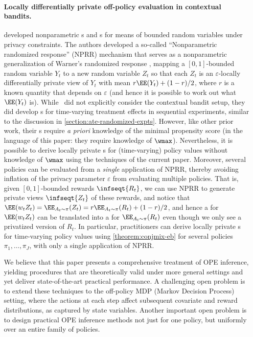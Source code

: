 \paragraph{Locally differentially private off-policy evaluation in contextual bandits.}
\citet{waudby2022locally} developed nonparametric \cs{}s and \ci{}s for means of bounded random variables under privacy constraints. The authors developed a so-called ``Nonparametric randomized response'' (NPRR) mechanism that serves as a nonparametric generalization of Warner's randomized response \citep{warner1965randomized}, mapping a $[0, 1]$-bounded random variable $Y_t$ to a new random variable $Z_t$ so that each $Z_t$ is an $\varepsilon$-locally differentially private view of $Y_t$ with mean $r\EE(Y_t) + (1-r)/2$, where $r$ is a known quantity that depends on $\varepsilon$ (and hence it is possible to work out what $\EE(Y_t)$ is). While~\citet{waudby2022locally} did not explicitly consider the contextual bandit setup, they did develop \cs{}s for time-varying treatment effects in sequential experiments, similar to the discussion in \cref{section:ate-randomized-expts}. However, like other prior work, their \cs{}s require \emph{a priori} knowledge of the minimal propensity score (in the language of this paper: they require knowledge of $\wmax$). Nevertheless, it is possible to derive locally private \cs{}s for (time-varying) policy values without knowledge of $\wmax$ using the techniques of the current paper. Moreover, several policies can be evaluated from a \emph{single} application of NPRR, thereby avoiding inflation of the privacy parameter $\varepsilon$ from evaluating multiple policies. That is, given $[0, 1]$-bounded rewards $\infseqt{R_t}$, we can use NPRR to generate private views $\infseqt{Z_t}$ of these rewards, and notice that $\EE(w_tZ_t) = \EE_{A_t \sim \pi}(Z_t) = r\EE_{A_t\sim\pi}(R_t) + (1-r)/2$, and hence a \cs{} for $\EE(w_tZ_t)$ can be translated into a \cs{} for $\EE_{A_t \sim \pi}(R_t)$ even though we only see a privatized version of $R_t$. In particular, practitioners can derive locally private \cs{}s for time-varying policy values using \cref{theorem:conjmix-eb} for several policies $\pi_1, \dots, \pi_J$, with only a single application of NPRR.


\bigskip

We believe that this paper presents a comprehensive treatment of OPE inference, yielding procedures that are theoretically valid under more general settings and yet deliver state-of-the-art practical performance. A challenging open problem is to extend these techniques to the off-policy MDP (Markov Decision Process) setting, where the actions at each step affect subsequent covariate and reward distributions, as captured by state variables. Another important open problem is to design practical OPE inference methods not just for one policy, but uniformly over an entire family of policies. 

